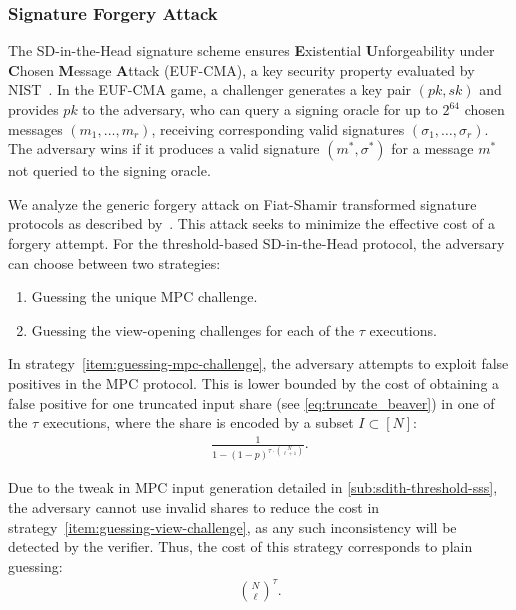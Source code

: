 \documentclass[11pt]{report}
\theoremstyle{definition}
\theoremstyle{plain}
\begin{document}
\subsubsection{Signature Forgery Attack}

The SD-in-the-Head signature scheme ensures \textbf{E}xistential \textbf{U}nforgeability under \textbf{C}hosen \textbf{M}essage \textbf{A}ttack (EUF-CMA), a key security property evaluated by NIST~\cite{nistcall,aguilarsyndrome11}. In the EUF-CMA game, a challenger generates a key pair $(pk, sk)$ and provides $pk$ to the adversary, who can query a signing oracle for up to $2^{64}$ chosen messages $(m_1, \dots, m_r)$, receiving corresponding valid signatures $(\sigma_1, \dots, \sigma_r)$. The adversary wins if it produces a valid signature $(m^*, \sigma^*)$ for a message $m^*$ not queried to the signing oracle.

We analyze the generic forgery attack on Fiat-Shamir transformed signature protocols as described by~\cite{kales2020attack}. This attack seeks to minimize the effective cost of a forgery attempt. For the threshold-based SD-in-the-Head protocol, the adversary can choose between two strategies:
\begin{enumerate}
  \item \label{item:guessing-mpc-challenge} Guessing the unique MPC challenge.
  \item \label{item:guessing-view-challenge} Guessing the view-opening challenges for each of the $\tau$ executions.
\end{enumerate}

In strategy~\ref*{item:guessing-mpc-challenge}, the adversary attempts to exploit false positives in the MPC protocol. This is lower bounded by the cost of obtaining a false positive for one truncated input share (see \autoref{eq:truncate_beaver}) in one of the $\tau$ executions, where the share is encoded by a subset $I \subset [N]$:
\begin{align*}
  \frac{1}{1 - (1-p)^{\tau \cdot \binom{N}{\ell + 1}}}.
\end{align*}

Due to the tweak in MPC input generation detailed in \autoref{sub:sdith-threshold-sss}, the adversary cannot use invalid shares to reduce the cost in strategy~\ref*{item:guessing-view-challenge}, as any such inconsistency will be detected by the verifier. Thus, the cost of this strategy corresponds to plain guessing:
\begin{align*}
  \binom{N}{\ell}^\tau.
\end{align*}
\end{document}
